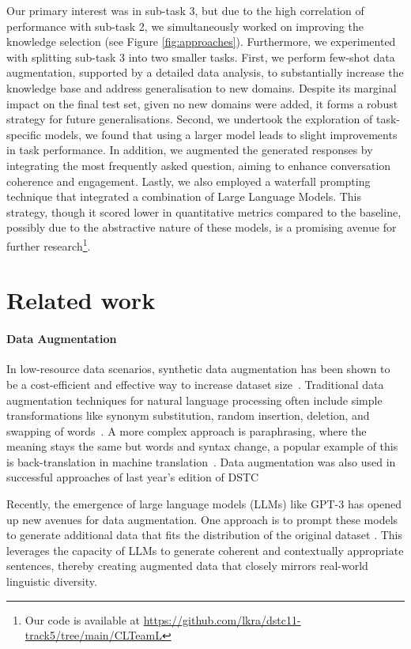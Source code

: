 \documentclass[11pt]{article}
\begin{document}
Our primary interest was in sub-task 3, but due to the high correlation of performance with sub-task 2, we simultaneously worked on improving the knowledge selection (see Figure \ref{fig:approaches}). Furthermore, we experimented with splitting sub-task 3 into two smaller tasks. First, we perform few-shot data augmentation, supported by a detailed data analysis, to substantially increase the knowledge base and address generalisation to new domains. Despite its marginal impact on the final test set, given no new domains were added, it forms a robust strategy for future generalisations. Second, we undertook the exploration of task-specific models, we found that using a larger model leads to slight improvements in task performance. In addition, we augmented the generated responses by integrating the most frequently asked question, aiming to enhance conversation coherence and engagement.
Lastly, we also employed a waterfall prompting technique that integrated a combination of Large Language Models. This strategy, though it scored lower in quantitative metrics compared to the baseline, possibly due to the abstractive nature of these models, is a promising avenue for further research\footnote{Our code is available at \url{https://github.com/lkra/dstc11-track5/tree/main/CLTeamL}}.

\section{Related work}
\paragraph{Data Augmentation}
In low-resource data scenarios, synthetic data augmentation has been shown to be a cost-efficient and effective way to increase dataset size~\cite{Anaby-Tavor_etal_2020}. Traditional data augmentation techniques for natural language processing often include simple transformations like synonym substitution, random insertion, deletion, and swapping of words~\cite{wei-zou-2019-eda}. A more complex approach is paraphrasing, where the meaning stays the same but words and syntax change, a popular example of this is back-translation in machine translation~\cite{sennrich-etal-2016-improving}. Data augmentation was also used in successful approaches of last year's edition of DSTC~\cite{tian2021tod-da, thulkeDSTC2021}

Recently, the emergence of large language models (LLMs) like GPT-3 \cite{brown2020language} has opened up new avenues for data augmentation. One approach is to prompt these models to generate additional data that fits the distribution of the original dataset \cite{kumar-etal-2020-data, xia-etal-2020-composed, lee2021neural}. This leverages the capacity of LLMs to generate coherent and contextually appropriate sentences, thereby creating augmented data that closely mirrors real-world linguistic diversity.
\end{document}
